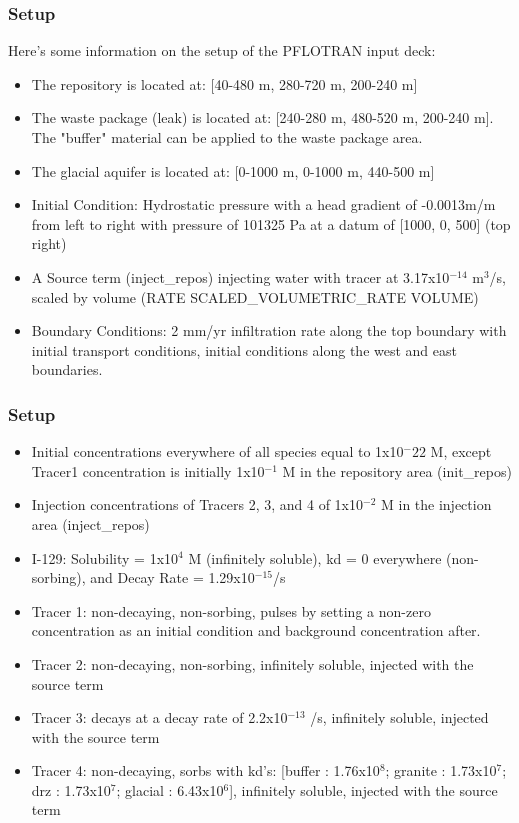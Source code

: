 \documentclass{beamer}
\begin{document}
\begin{frame}\frametitle{Setup}
	Here's some information on the setup of the PFLOTRAN input deck:
	\begin{itemize}
		\item The repository is located at: [40-480 m, 280-720 m, 200-240 m]
		\item The waste package (leak) is located at: [240-280 m, 480-520 m, 200-240 m]. The "buffer" material can be applied to the waste package area.
		\item The glacial aquifer is located at: [0-1000 m, 0-1000 m, 440-500 m]
		\item Initial Condition: Hydrostatic pressure with a head gradient of -0.0013m/m from left to right with pressure of 101325 Pa at a datum of [1000, 0, 500] (top right)
		\item A Source term (inject\_repos) injecting water with tracer at 3.17x10$^{-14}$ m$^3$/s, scaled by volume (RATE SCALED\_VOLUMETRIC\_RATE VOLUME) 
		\item Boundary Conditions: 2 mm/yr infiltration rate along the top boundary with initial transport conditions, initial conditions along the west and east boundaries.
	\end{itemize}
	
\end{frame}

\begin{frame}\frametitle{Setup}
		\begin{itemize}
			\item Initial concentrations everywhere of all species equal to 1x10${^-22}$ M, except Tracer1 concentration is initially 1x10$^{-1}$ M in the repository area (init\_repos)
			\item Injection concentrations of Tracers 2, 3, and 4 of 1x10$^{-2}$ M in the injection area (inject\_repos)
			\item I-129: Solubility = 1x10$^4$ M (infinitely soluble), kd = 0 everywhere (non-sorbing), and Decay Rate = 1.29x10$^{-15}$/s
			\item Tracer 1: non-decaying, non-sorbing, pulses by setting a non-zero concentration as an initial condition and background concentration after.
			\item Tracer 2: non-decaying, non-sorbing, infinitely soluble, injected with the source term
			\item Tracer 3: decays at a decay rate of 2.2x10$^{-13}$ /s, infinitely soluble, injected with the source term
			\item Tracer 4: non-decaying, sorbs with kd's: [buffer : 1.76x10$^8$; granite : 1.73x10$^7$; drz : 1.73x10$^7$; glacial : 6.43x10$^6$], infinitely soluble, injected with the source term
		\end{itemize}
			
\end{frame}
\end{document}
